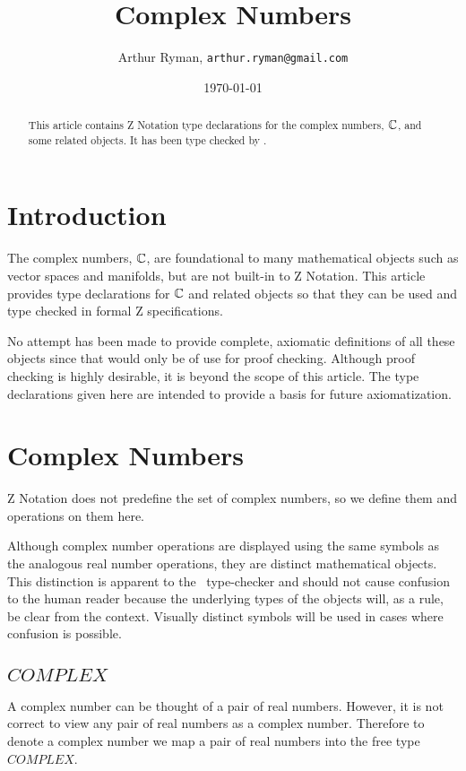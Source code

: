 \documentclass[11pt, oneside]{article}
\title{Complex Numbers}
\author{Arthur Ryman, {\tt arthur.ryman@gmail.com}}
\date{\today}
\begin{document}
\maketitle

\begin{abstract}
This article contains Z Notation type declarations for the complex numbers, $\mathbb{C}$, and some related objects.
It has been type checked by \fuzz.
\end{abstract}

\section{Introduction}

The complex numbers, $\mathbb{C}$, are foundational to many mathematical objects such as vector spaces and manifolds,
but are not built-in to Z Notation.
This article provides type declarations for $\mathbb{C}$ and related objects so that they can be used and type checked in formal Z specifications.

No attempt has been made to provide complete, axiomatic definitions of all these objects since that would only be of use for proof checking.
Although proof checking is highly desirable, it is beyond the scope of this article.
The type declarations given here are intended to provide a basis for future axiomatization.

\section{Complex Numbers}

Z Notation does not predefine the set of complex numbers, so we define
them and operations on them here.

Although complex number operations are displayed using the same symbols as the 
analogous real number operations,
they are distinct mathematical objects.
This distinction is apparent to the \fuzz\ type-checker and should not cause confusion to the human reader
because the underlying types of the objects will, as a rule, be clear from the context.
Visually distinct symbols will be used in cases where confusion is possible.

\subsection{$COMPLEX$}

A complex number can be thought of a pair of real numbers.
However, it is not correct to view any pair of real numbers as a complex number.
Therefore to denote a complex number we map a pair of real numbers
into the free type $COMPLEX$.
\end{document}
